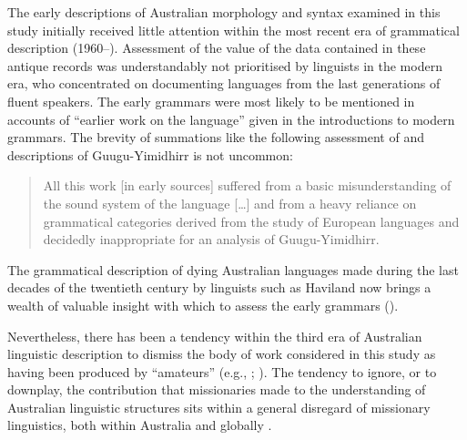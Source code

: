 The early descriptions of Australian morphology and syntax examined in this study initially received little attention within the most recent era of grammatical description (1960--). Assessment of the value of the data contained in these antique records was understandably not prioritised by linguists in the modern era, who concentrated on documenting languages from the last generations of fluent speakers. The early grammars were most likely to be mentioned in accounts of “earlier work on the language” given in the introductions to modern grammars. The brevity of summations like the following assessment of  and  descriptions of Guugu{\hyp}Yimidhirr is not uncommon:

\begin{quote}
    All this work [in early sources] suffered from a basic misunderstanding of the sound system of the language […] and from a heavy reliance on grammatical categories derived from the study of European languages and decidedly inappropriate for an analysis of Guugu{\hyp}Yimidhirr. \citep[35]{haviland_guugu_1979}
\end{quote}

The grammatical description of dying Australian languages made during the last decades of the twentieth century by linguists such as Haviland now brings a wealth of valuable insight with which to assess the early grammars ().

Nevertheless, there has been a tendency within the third era of Australian linguistic description to dismiss the body of work considered in this study as having been produced by “amateurs” (e.g., \citealt[15]{dixon_languages_1980}; \citealt[4]{blake_introduction_1991}). The tendency to ignore, or to downplay, the contribution that missionaries made to the understanding of Australian linguistic structures sits within a general disregard of missionary linguistics, both within Australia \citep[260--261]{carey_lancelot_2004} and globally \citep[121]{mcgregor_missionary_2008}. 

